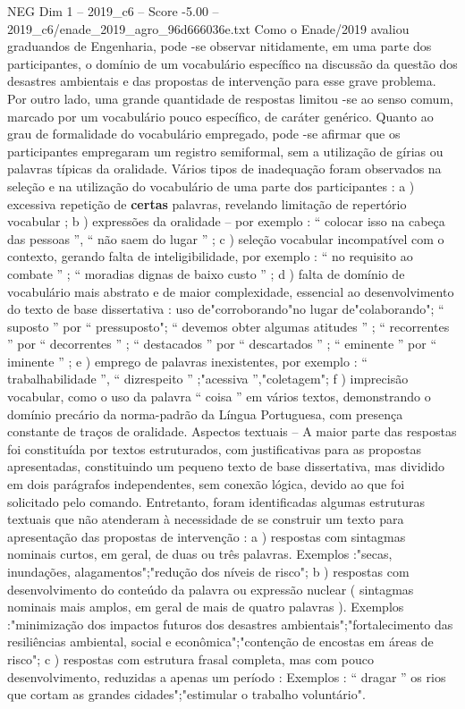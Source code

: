 \begin{textsample}{NEG Dim 1 – 2019\_c6 – Score -5.00 – 2019\_c6/enade\_2019\_agro\_96d666036e.txt}
Como o Enade/2019 avaliou graduandos de Engenharia, pode -se observar nitidamente, em uma parte dos participantes, o domínio de um vocabulário específico na discussão da questão dos desastres ambientais e das propostas de intervenção para esse grave problema.
Por outro lado, uma grande quantidade de respostas limitou -se ao senso comum, marcado por um vocabulário pouco específico, de caráter genérico.
Quanto ao grau de formalidade do vocabulário empregado, pode -se afirmar que os participantes empregaram um registro semiformal, sem a utilização de gírias ou palavras típicas da oralidade.
Vários tipos de inadequação foram observados na seleção e na utilização do vocabulário de uma parte dos participantes : a ) excessiva repetição de \textbf{certas} palavras, revelando limitação de repertório vocabular ; b ) expressões da oralidade – por exemplo : “ colocar isso na cabeça das pessoas ”, “ não saem do lugar ” ; c ) seleção vocabular incompatível com o contexto, gerando falta de inteligibilidade, por exemplo : “ no requisito ao combate ” ; “ moradias dignas de baixo custo ” ; d ) falta de domínio de vocabulário mais abstrato e de maior complexidade, essencial ao desenvolvimento do texto de base dissertativa : uso de"corroborando"no lugar de"colaborando"; “ suposto ” por “ pressuposto"; “ devemos obter algumas atitudes ” ; “ recorrentes ” por “ decorrentes ” ; “ destacados ” por “ descartados ” ; “ eminente ” por “ iminente ” ; e ) emprego de palavras inexistentes, por exemplo : “ trabalhabilidade ”, “ dizrespeito ” ;"acessiva ”,"coletagem"; f ) imprecisão vocabular, como o uso da palavra “ coisa ” em vários textos, demonstrando o domínio precário da norma-padrão da Língua Portuguesa, com presença constante de traços de oralidade.
Aspectos textuais – A maior parte das respostas foi constituída por textos estruturados, com justificativas para as propostas apresentadas, constituindo um pequeno texto de base dissertativa, mas dividido em dois parágrafos independentes, sem conexão lógica, devido ao que foi solicitado pelo comando.
Entretanto, foram identificadas algumas estruturas textuais que não atenderam à necessidade de se construir um texto para apresentação das propostas de intervenção : a ) respostas com sintagmas nominais curtos, em geral, de duas ou três palavras.
Exemplos :"secas, inundações, alagamentos";"redução dos níveis de risco"; b ) respostas com desenvolvimento do conteúdo da palavra ou expressão nuclear ( sintagmas nominais mais amplos, em geral de mais de quatro palavras ).
Exemplos :"minimização dos impactos futuros dos desastres ambientais";"fortalecimento das resiliências ambiental, social e econômica";"contenção de encostas em áreas de risco"; c ) respostas com estrutura frasal completa, mas com pouco desenvolvimento, reduzidas a apenas um período : Exemplos : “ dragar ” os rios que cortam as grandes cidades";"estimular o trabalho voluntário".

\end{textsample}
